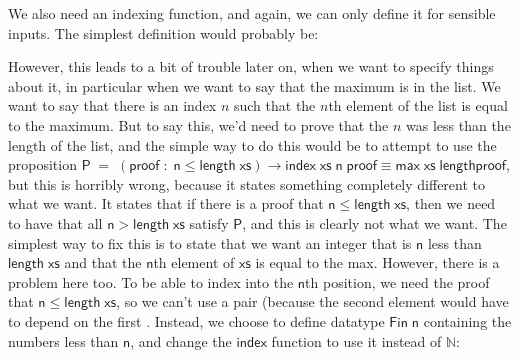 \documentclass{article}
\newcommand{\Conid}[1]{\mathit{#1}}
\newcommand{\Varid}[1]{\mathit{#1}}
\def\resethooks{%
  \global\let\SaveRestoreHook\empty
  \global\let\ColumnHook\empty}
\let\hspre\empty
\let\hspost\empty
\renewcommand\Varid[1]{\mathord{\textsf{#1}}}
\let\Conid\Varid
\begin{document}
We also need an indexing function, and again, we can only define it for sensible inputs. The simplest definition would probably be:
\resethooks
However, this leads to a bit of trouble later on, when we want to specify things about it, in particular when we want to say that the maximum is in the list. We want to say that there is an index $n$ such that the $n$th element of the list is equal to the maximum. But to say this, we'd need to prove that the $n$ was less than the length of the list, and the simple way to do this would be to attempt to use the proposition \ensuremath{\Conid{P}\;\mathrel{=}\;(\Varid{proof}\;\mathbin{:}\;\Varid{n}\;\Varid{≤}\;\Varid{length}\;\Varid{xs})\;\Varid{→}\;\Varid{index}\;\Varid{xs}\;\Varid{n}\;\Varid{proof}\;\Varid{≡}\;\Varid{max}\;\Varid{xs}\;\Varid{lengthproof}}, but this is horribly wrong, because it states something completely different to what we want. It states that if there is a proof that \ensuremath{\Varid{n}\;\Varid{≤}\;\Varid{length}\;\Varid{xs}}, then we need to have that all \ensuremath{\Varid{n}\;\Varid{>}\;\Varid{length}\;\Varid{xs}} satisfy \ensuremath{\Conid{P}}, and this is clearly not what we want. The simplest way to fix this is to state that we want an integer that is \ensuremath{\Varid{n}} less than \ensuremath{\Varid{length}\;\Varid{xs}} and that the \ensuremath{\Varid{n}}th element of \ensuremath{\Varid{xs}} is equal to the max. However, there is a problem here too. To be able to index into the \ensuremath{\Varid{n}}th position, we need the proof that \ensuremath{\Varid{n}\;\Varid{≤}\;\Varid{length}\;\Varid{xs}}, so we can't use a pair (because the second element would have to depend on the first . Instead, we choose to define datatype \ensuremath{\Conid{Fin}\;\Varid{n}} containing the numbers less than \ensuremath{\Varid{n}}, and change the \ensuremath{\Varid{index}} function to use it instead of \ensuremath{\Conid{ℕ}}:
\end{document}
